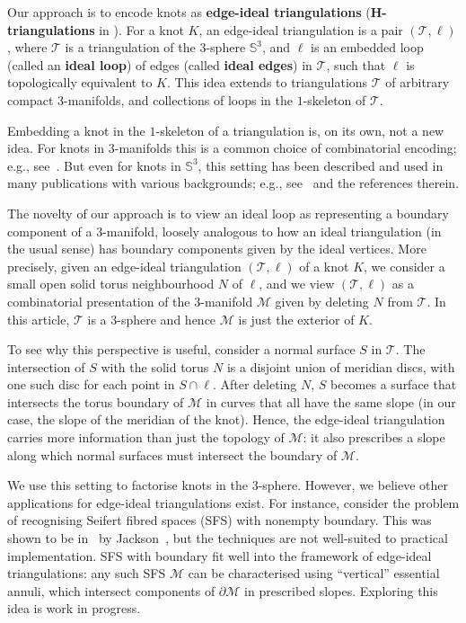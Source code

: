 \documentclass[10pt,a4paper]{amsart}
\newcommand{\tri}{\mathcal{T}}
\newcommand{\manifold}{\mathcal{M}}
\begin{document}
Our approach is to encode knots as \textbf{edge-ideal triangulations} (\textbf{H-triangulations} in \cite{aribi2023Htriangulation}).
For a knot $K$, an edge-ideal triangulation is a pair $(\tri,\ell)$, where $\tri$ is a triangulation of the $3$-sphere $\mathbb{S}^3$,
and $\ell$ is an embedded loop (called an \textbf{ideal loop}) of edges (called \textbf{ideal edges}) in $\tri$, such that $\ell$ is topologically equivalent to $K$.
This idea extends to triangulations $\tri$ of arbitrary compact $3$-manifolds, and collections of loops in the $1$-skeleton of $\tri$.

Embedding a knot in the $1$-skeleton of a triangulation is, on its own, not a new idea. For knots in $3$-manifolds this is a common choice of combinatorial encoding; e.g., see~\cite{agol2006computational,lackenby2016efficient}.
But even for knots in $\mathbb{S}^3$, this setting has been described and used in many publications with various backgrounds;
e.g., see~\cite{aribi2023Htriangulation,Benedetti12,BenedettiLutz:KnotsInCollapsible,burton2023counterexamples,ibarra2024Htriangulation,Lickorish1991} and the references therein.

The novelty of our approach is to view an ideal loop as representing a boundary component of a $3$-manifold,
loosely analogous to how an ideal triangulation (in the usual sense) has boundary components given by the ideal vertices.
More precisely, given an edge-ideal triangulation $(\tri,\ell)$ of a knot $K$, we consider a small open solid torus neighbourhood $N$ of $\ell$,
and we view $(\tri,\ell)$ as a combinatorial presentation of the $3$-manifold $\manifold$ given by deleting $N$ from $\tri$.
In this article, $\tri$ is a $3$-sphere and hence $\manifold$ is just the exterior of $K$.

To see why this perspective is useful, consider a normal surface $S$ in $\tri$.
The intersection of $S$ with the solid torus $N$ is a disjoint union of meridian discs, with one such disc for each point in $S\cap\ell$.
After deleting $N$, $S$ becomes a surface that intersects the torus boundary of $\manifold$ in curves that all have the same slope
(in our case, the slope of the meridian of the knot).
Hence, the edge-ideal triangulation carries more information than just the topology of $\manifold$: it also prescribes a slope along which normal surfaces must intersect the boundary of $\manifold$.

We use this setting to factorise knots in the $3$-sphere. However, we believe other applications for edge-ideal triangulations exist.
For instance, consider the problem of recognising Seifert fibred spaces (SFS) with nonempty boundary.
This was shown to be in \NP\ by Jackson~\cite{jackson2024seifert}, but the techniques are not well-suited to practical implementation.
SFS with boundary fit well into the framework of edge-ideal triangulations:
any such SFS $\manifold$ can be characterised using ``vertical'' essential annuli, which intersect components of $\partial \manifold$ in prescribed slopes.
Exploring this idea is work in progress.
\end{document}
